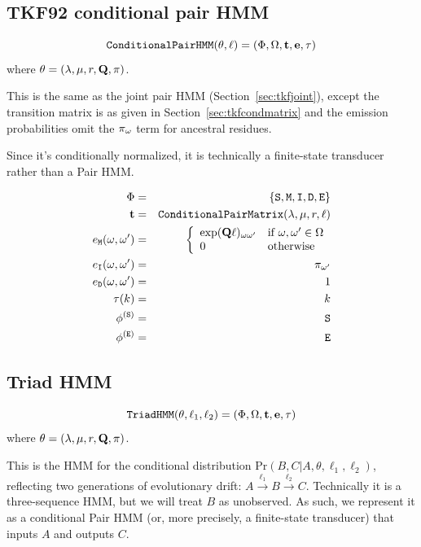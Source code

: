 \documentclass{article}
\newcommand\prob[1]{\mbox{Pr}\left( #1 \right)}
\newcommand\seclabel[1]{\label{sec:#1}}
\newcommand\secref[1]{Section~\ref{sec:#1}}
\begin{document}
\subsection{TKF92 conditional pair HMM}
\seclabel{tkfcond}

\[
{\tt ConditionalPairHMM}(\theta,\ell) = (\Phi,\Omega,{\bf t},{\bf e},\tau)
\]
where $\theta = (\lambda,\mu,r,{\bf Q},\pi)$.

This is the same as the joint pair HMM (\secref{tkfjoint}),
except the transition matrix is as given in \secref{tkfcondmatrix}
and the emission probabilities omit the $\pi_\omega$ term for ancestral residues.

Since it's conditionally normalized, it is technically a finite-state transducer rather than a Pair HMM.

\begin{eqnarray*}
   \Phi & = & \{ {\tt S}, {\tt M}, {\tt I}, {\tt D}, {\tt E} \} \\
   {\bf t} & = & {\tt ConditionalPairMatrix}(\lambda,\mu,r,\ell) \\
   e_{\tt M}(\omega,\omega') & = &
   \left\{
   \begin{array}{ll}
   \exp({\bf Q} \ell)_{\omega \omega'} & \mbox{if $\omega,\omega' \in \Omega$}
   \\ 0 & \mbox{otherwise}
   \end{array}
   \right. \\
   e_{\tt I}(\omega,\omega') & = & \pi_{\omega'} \\
   e_{\tt D}(\omega,\omega') & = & 1 \\
   \tau(k) & = & k \\
   \phi^{({\tt S})} & = & {\tt S} \\
   \phi^{({\tt E})} & = & {\tt E}
\end{eqnarray*}

\subsection{Triad HMM}
\seclabel{triadhmm}

\[
{\tt TriadHMM}(\theta,\ell_1,\ell_2) = (\Phi,\Omega,{\bf t},{\bf e},\tau)
\]
where $\theta = (\lambda,\mu,r,{\bf Q},\pi)$.

This is the HMM for the conditional distribution $\prob{B,C|A,\theta,\ell_1,\ell_2}$, reflecting two generations
of evolutionary drift: $A \xrightarrow{\ell_1} B \xrightarrow{\ell_2} C$.
Technically it is a three-sequence HMM, but we will treat $B$ as unobserved.
As such, we represent it as a conditional Pair HMM (or, more precisely, a finite-state transducer)
that inputs $A$ and outputs $C$.
\end{document}
